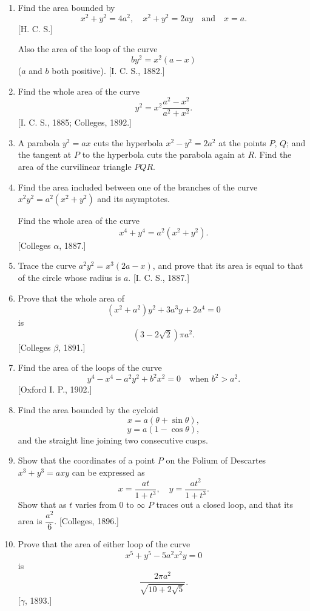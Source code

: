 \documentclass[11pt, a4paper]{article}
\newcommand{\source}[1]{\hfill\textnormal{[#1]}}
\begin{document}
\begin{enumerate}[leftmargin=2em]

\item Find the area bounded by
\[
x^2+y^2=4a^2,\quad x^2+y^2=2ay\quad\text{and}\quad x=a.
\]
\source{H. C. S.}

Also the area of the loop of the curve
\[
by^2=x^2(a-x)
\]
($a$ and $b$ both positive). \source{I. C. S., 1882.}

\item Find the whole area of the curve
\[
y^2=x^2\frac{a^2-x^2}{a^2+x^2}.
\]
\source{I. C. S., 1885; Colleges, 1892.}

\item A parabola $y^2=ax$ cuts the hyperbola $x^2-y^2=2a^2$ at the points $P$, $Q$; and the tangent at $P$ to the hyperbola cuts the parabola again at $R$. Find the area of the curvilinear triangle $PQR$.

\item Find the area included between one of the branches of the curve $x^2y^2=a^2(x^2+y^2)$ and its asymptotes.

Find the whole area of the curve
\[
x^4+y^4=a^2(x^2+y^2).
\]
\source{Colleges $\alpha$, 1887.}

\item Trace the curve $a^2y^2=x^3(2a-x)$, and prove that its area is equal to that of the circle whose radius is $a$. \source{I. C. S., 1887.}

\item Prove that the whole area of
\[
(x^2+a^2)y^2+3a^3y+2a^4=0
\]
is
\[
(3-2\sqrt2)\pi a^2.
\]
\source{Colleges $\beta$, 1891.}

\item Find the area of the loops of the curve
\[
y^4-x^4-a^2y^2+b^2x^2=0\quad\text{when } b^2>a^2.
\]
\source{Oxford I. P., 1902.}

\item Find the area bounded by the cycloid
\[
x=a(\theta+\sin\theta),
\]
\[
y=a(1-\cos\theta),
\]
and the straight line joining two consecutive cusps.

\item Show that the coordinates of a point $P$ on the Folium of Descartes $x^3+y^3=axy$ can be expressed as
\[
x=\frac{at}{1+t^3},\quad y=\frac{at^2}{1+t^3}.
\]
Show that as $t$ varies from $0$ to $\infty$ $P$ traces out a closed loop, and that its area is $\dfrac{a^2}{6}$. \source{Colleges, 1896.}

\item Prove that the area of either loop of the curve
\[
x^5+y^5-5a^2x^2y=0
\]
is
\[
\frac{2\pi a^2}{\sqrt{10+2\sqrt5}}.
\]
\source{$\gamma$, 1893.}


\end{enumerate}
\end{document}
